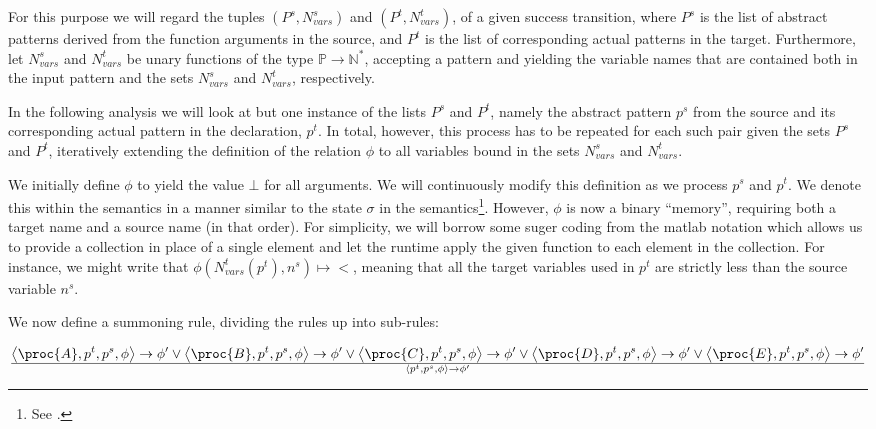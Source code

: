 For this purpose we will regard the tuples $(P^s,N_{vars}^s)$ and
$(P^t,N_{vars}^t)$, of a given success transition, where $P^s$ is the list of
abstract patterns derived from the function arguments in the source, and $P^t$
is the list of corresponding actual patterns in the target. Furthermore, let
$N_{vars}^s$ and $N_{vars}^t$ be unary functions of the type
$\mathbb{P}\rightarrow\mathbb{N}^*$, accepting a pattern and yielding the
variable names that are contained both in the input pattern and the sets
$N_{vars}^s$ and $N_{vars}^t$, respectively.

In the following analysis we will look at but one instance of the lists $P^s$
and $P^t$, namely the abstract pattern $p^s$ from the source and its
corresponding actual pattern in the declaration, $p^t$. In total, however, this
process has to be repeated for each such pair given the sets $P^s$ and $P^t$,
iteratively extending the definition of the relation $\phi$ to all variables
bound in the sets $N_{vars}^s$ and $N_{vars}^t$.

We initially define $\phi$ to yield the value $\bot$ for all arguments. We will
continuously modify this definition as we process $p^s$ and $p^t$. We denote
this within the semantics in a manner similar to the state $\sigma$ in the
semantics\footnote{See .}. However, $\phi$ is now a
binary ``memory'', requiring both a target name and a source name (in that
order). For simplicity, we will borrow some suger coding from the matlab
notation which allows us to provide a collection in place of a single element
and let the runtime apply the given function to each element in the collection.
For instance, we might write that $\phi\left(N_{vars}^t(p^t), n^s\right)\mapsto
<$, meaning that all the target variables used in $p^t$ are strictly less than
the source variable $n^s$.

We now define a summoning rule, dividing the rules up into sub-rules:

\begin{equation}
{
    \left\langle\proc{A},p^t,p^s,\phi\right\rangle
    \rightarrow
    \phi'
  \vee
    \left\langle\proc{B},p^t,p^s,\phi\right\rangle
    \rightarrow
    \phi'
  \vee
    \left\langle\proc{C},p^t,p^s,\phi\right\rangle
    \rightarrow
    \phi'
  \vee
    \left\langle\proc{D},p^t,p^s,\phi\right\rangle
    \rightarrow
    \phi'
  \vee
    \left\langle\proc{E},p^t,p^s,\phi\right\rangle
    \rightarrow
    \phi'
}\over{
  \left\langle p^t,p^s,\phi\right\rangle
  \rightarrow
  \phi'
}
\end{equation}

